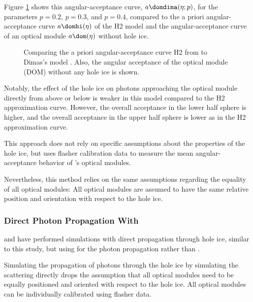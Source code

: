 Figure \ref{fig:Vohn9Oov} shows this angular-acceptance curve, $a\domdima(\eta;p)$, for the parameters $p=0.2$, $p=0.3$, and $p=0.4$, compared to the a priori angular-acceptance curve $a\domhi(\eta)$ of the H2 model and the angular-acceptance curve of an optical module $a\dom(\eta)$ without hole ice.

\begin{figure}[htbp]
  \caption{Comparing the a priori angular-acceptance curve H2 from \cite{icepaper} to Dimas's model \cite{flasherdataderivedicemodels}. Also, the angular acceptance of the optical module (DOM) without any hole ice is shown.}
  \label{fig:Vohn9Oov}
\end{figure}

Notably, the effect of the hole ice on photons approaching the optical module directly from above or below is weaker in this model compared to the H2 approximation curve. However, the overall acceptance in the lower half sphere is higher, and the overall acceptance in the upper half sphere is lower as in the H2 approximation curve.

This approach does not rely on specific assumptions about the properties of the hole ice, but uses flasher calibration data to measure the mean angular-acceptance behavior of \icecube's optical modules.

Nevertheless, this method relies on the same assumptions regarding the equality of all optical modules: All optical modules are assumed to have the same relative position and orientation with respect to the hole ice.


\subsubsection{Direct Photon Propagation With \ppc}
\label{sec:direct_photon_propagation_with_ppc}\label{sec:pocam}

\chirkin and \rongen have performed simulations with direct propagation through hole ice, similar to this study, but using \ppc for the photon propagation rather than \clsim. \cite{martinspicehddard, martindardupdate, pocam, icrc17pocam, ppcpaper}


Simulating the propagation of photons through the hole ice by simulating the scattering directly drops the assumption that all optical modules need to be equally positioned and oriented with respect to the hole ice. All optical modules can be individually calibrated using flasher data. \cite{martinspicehddard}

